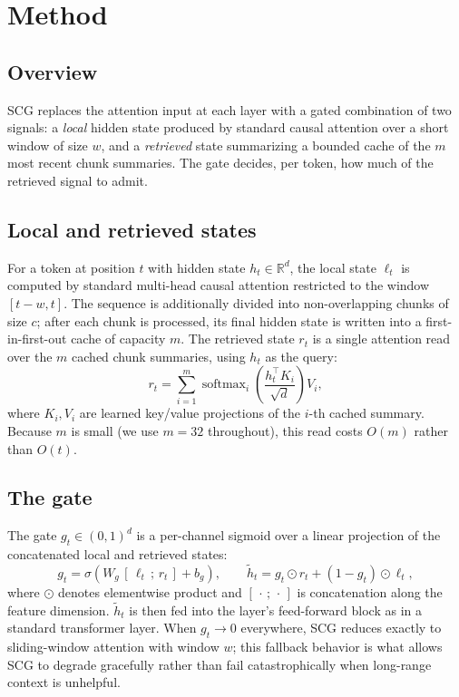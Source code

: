 \section{Method}
\label{sec:method}

\subsection{Overview}

SCG replaces the attention input at each layer with a gated combination of
two signals: a \emph{local} hidden state produced by standard causal
attention over a short window of size $w$, and a \emph{retrieved} state
summarizing a bounded cache of the $m$ most recent chunk summaries. The gate
decides, per token, how much of the retrieved signal to admit.

\subsection{Local and retrieved states}

For a token at position $t$ with hidden state $h_t \in \mathbb{R}^d$, the
local state $\ell_t$ is computed by standard multi-head causal attention
restricted to the window $[t-w, t]$. The sequence is additionally divided
into non-overlapping chunks of size $c$; after each chunk is processed, its
final hidden state is written into a first-in-first-out cache of capacity
$m$. The retrieved state $r_t$ is a single attention read over the $m$
cached chunk summaries, using $h_t$ as the query:
\begin{equation}
r_t = \sum_{i=1}^{m} \operatorname{softmax}_i\!\left(\frac{h_t^\top K_i}{\sqrt{d}}\right) V_i,
\label{eq:retrieval}
\end{equation}
where $K_i, V_i$ are learned key/value projections of the $i$-th cached
summary. Because $m$ is small (we use $m=32$ throughout), this read costs
$O(m)$ rather than $O(t)$.

\subsection{The gate}

The gate $g_t \in (0,1)^d$ is a per-channel sigmoid over a linear projection
of the concatenated local and retrieved states:
\begin{equation}
g_t = \sigma\!\left(W_g \,[\, \ell_t \,;\, r_t \,] + b_g\right), \qquad
\tilde{h}_t = g_t \odot r_t + (1 - g_t) \odot \ell_t,
\label{eq:gate}
\end{equation}
where $\odot$ denotes elementwise product and $[\,\cdot\,;\,\cdot\,]$ is
concatenation along the feature dimension. $\tilde{h}_t$ is then fed into the
layer's feed-forward block as in a standard transformer layer. When $g_t
\to 0$ everywhere, SCG reduces exactly to sliding-window attention with
window $w$; this fallback behavior is what allows SCG to degrade gracefully
rather than fail catastrophically when long-range context is unhelpful.

